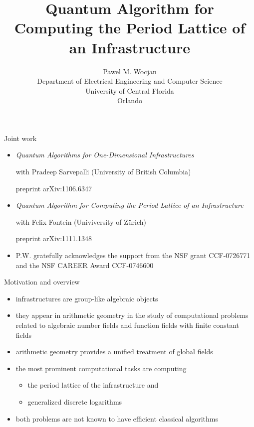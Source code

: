 \documentclass[slideColor]{prosper}
\title{Quantum Algorithm for Computing the Period Lattice of an Infrastructure}
\author{Pawel M. Wocjan\\[1ex]Department of Electrical Engineering and Computer Science\\ University of Central Florida\\Orlando}
\renewcommand{\>}{\rangle}
\newcommand{\<}{\langle}
\begin{document}
\maketitle

\begin{slide}{Joint work}
\vspace{-0.2cm}
\begin{itemize}
\item \emph{Quantum Algorithms for One-Dimensional Infrastructures}

\medskip
with Pradeep Sarvepalli (University of British Columbia)
 
\medskip
preprint arXiv:1106.6347

\bigskip
\item \emph{Quantum Algorithm for Computing the Period Lattice of an Infrastructure}
 
\medskip
with Felix Fontein (Univiversity of Z\"urich)
 
\medskip
preprint arXiv:1111.1348

\bigskip
\item P.W. gratefully acknowledges the support from the NSF grant CCF-0726771 and the NSF CAREER Award CCF-0746600
\end{itemize}
\end{slide}


\begin{slide}{Motivation and overview}
\vspace{-0.3cm}
\begin{itemize}
\item infrastructures are group-like algebraic objects

\medskip
\item they appear in arithmetic geometry in the study of computational problems related to
algebraic number fields and function fields with finite constant fields

\medskip
\item arithmetic geometry provides a unified treatment of global fields 

\medskip
\item
the most prominent computational tasks are computing 

\begin{itemize}
\item the period lattice of the infrastructure and

\medskip
\item generalized discrete logarithms
\end{itemize}

\medskip
\item
both problems are not known to have efficient classical algorithms
\end{itemize}

\end{slide}
\end{document}

